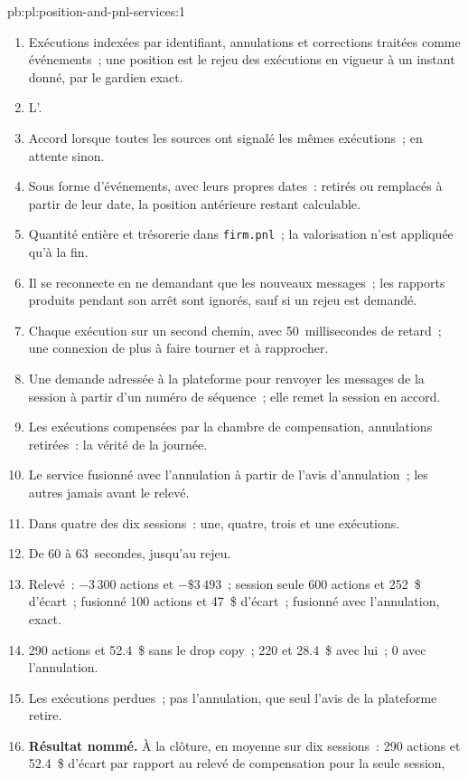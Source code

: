\begin{solution}{pb:pl:position-and-pnl-services:1}
\begin{enumerate}
\item Exécutions indexées par identifiant, annulations et corrections traitées comme événements~; une position est le rejeu des exécutions en vigueur à un instant donné,
par le gardien exact.
\item L'.
\item Accord lorsque toutes les sources ont signalé les mêmes exécutions~; en attente sinon.
\item Sous forme d'événements, avec leurs propres dates~: retirés ou remplacés à partir de leur date, la position antérieure restant calculable.
\item Quantité entière et trésorerie dans \texttt{firm.pnl}~; la valorisation n'est appliquée qu'à la fin.
\item Il se reconnecte en ne demandant que les nouveaux messages~; les rapports produits pendant son arrêt sont ignorés, sauf si un rejeu est demandé.
\item Chaque exécution sur un second chemin, avec 50~millisecondes de retard~; une connexion de plus à faire tourner et à rapprocher.
\item Une demande adressée à la plateforme pour renvoyer les messages de la session à partir d'un numéro de séquence~; elle remet la session en accord.
\item Les exécutions compensées par la chambre de compensation, annulations retirées~: la vérité de la journée.
\item Le service fusionné avec l'annulation à partir de l'avis d'annulation~; les autres jamais avant le relevé.
\item Dans quatre des dix sessions~: une, quatre, trois et une exécutions.
\item De 60 à 63~secondes, jusqu'au rejeu.
\item Relevé~: $-3\,300$ actions et $-\$3\,493$~; session seule 600 actions et 252~\$ d'écart~; fusionné 100 actions et 47~\$ d'écart~; fusionné avec l'annulation, exact.
\item 290 actions et 52.4~\$ sans le drop copy~; 220 et 28.4~\$ avec lui~; 0 avec l'annulation.
\item Les exécutions perdues~; pas l'annulation, que seul l'avis de la plateforme retire.
\item \textbf{Résultat nommé.} À la clôture, en moyenne sur dix sessions~: 290 actions et 52.4~\$ d'écart par rapport au relevé de compensation pour la seule session,

\end{enumerate}
\end{solution}
